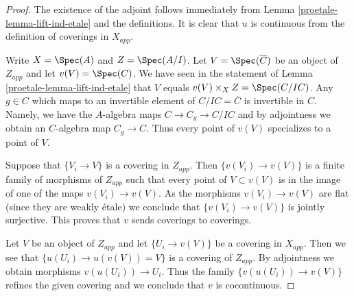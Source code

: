 \begin{proof}

The existence of the adjoint follows immediately from
Lemma \ref{proetale-lemma-lift-ind-etale} and the definitions.
It is clear that $u$ is continuous from the definition of
coverings in $X_{app}$.

\medskip\noindent
Write $X = \Spec(A)$ and $Z = \Spec(A/I)$. Let $V = \Spec(\overline{C})$
be an object of $Z_{app}$ and let $v(V) = \Spec(C)$.
We have seen in the statement of Lemma \ref{proetale-lemma-lift-ind-etale}
that $V$ equals $v(V) \times_X Z = \Spec(C/IC)$.
Any $g \in C$ which maps to an invertible element of
$C/IC = \overline{C}$ is invertible in $C$. Namely, we have the
$A$-algebra maps $C \to C_g \to C/IC$ and by adjointness
we obtain an $C$-algebra map $C_g \to C$.
Thus every point of $v(V)$ specializes to a point of $V$.

\medskip\noindent
Suppose that $\{V_i \to V\}$ is a covering in $Z_{app}$.
Then $\{v(V_i) \to v(V)\}$ is a finite family of morphisms of
$Z_{app}$ such that every point of $V \subset v(V)$ is
in the image of one of the maps $v(V_i) \to v(V)$. As the
morphisms $v(V_i) \to v(V)$ are flat (since they are weakly \'etale)
we conclude that $\{v(V_i) \to v(V)\}$ is jointly surjective.
This proves that $v$ sends coverings to coverings.

\medskip\noindent
Let $V$ be an object of $Z_{app}$ and let $\{U_i \to v(V)\}$
be a covering in $X_{app}$. Then we see that
$\{u(U_i) \to u(v(V)) = V\}$ is a covering of $Z_{app}$.
By adjointness we obtain morphisms $v(u(U_i)) \to U_i$.
Thus the family $\{v(u(U_i)) \to v(V)\}$ refines the given
covering and we conclude that $v$ is cocontinuous.
\end{proof}

